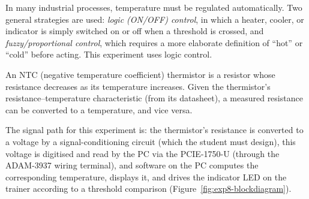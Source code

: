 \begin{introduction}
  In many industrial processes, temperature must be regulated automatically. Two general strategies are used: \textit{logic (ON/OFF) control}, in which a heater, cooler, or indicator is simply switched on or off when a threshold is crossed, and \textit{fuzzy/proportional control}, which requires a more elaborate definition of ``hot'' or ``cold'' before acting. This experiment uses logic control.
  \vspace*{1.5em}

  An NTC (negative temperature coefficient) thermistor is a resistor whose resistance decreases as its temperature increases. Given the thermistor's resistance--temperature characteristic (from its datasheet), a measured resistance can be converted to a temperature, and vice versa.
  \vspace*{1.5em}

  The signal path for this experiment is: the thermistor's resistance is converted to a voltage by a signal-conditioning circuit (which the student must design), this voltage is digitised and read by the PC via the PCIE-1750-U (through the ADAM-3937 wiring terminal), and software on the PC computes the corresponding temperature, displays it, and drives the indicator LED on the trainer according to a threshold comparison (Figure~\ref{fig:exp8-blockdiagram}).
\end{introduction}

\begin{boxedfigure}
  \centering
  \label{fig:exp8-blockdiagram}
\end{boxedfigure}

